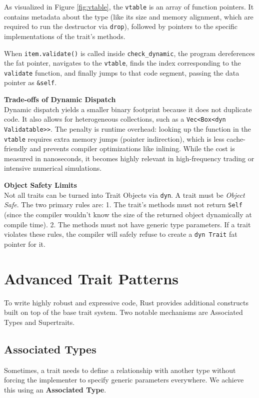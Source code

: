 As visualized in Figure \ref{fig:vtable}, the \texttt{vtable} is an array of function pointers. It contains metadata about the type (like its size and memory alignment, which are required to run the destructor via \texttt{drop}), followed by pointers to the specific implementations of the trait's methods. 

When \texttt{item.validate()} is called inside \texttt{check\_dynamic}, the program dereferences the fat pointer, navigates to the \texttt{vtable}, finds the index corresponding to the \texttt{validate} function, and finally jumps to that code segment, passing the data pointer as \texttt{\&self}.

\begin{exambox}
\textbf{Trade-offs of Dynamic Dispatch} \\
Dynamic dispatch yields a smaller binary footprint because it does not duplicate code. It also allows for heterogeneous collections, such as a \texttt{Vec<Box<dyn Validatable>>}. The penalty is runtime overhead: looking up the function in the \texttt{vtable} requires extra memory jumps (pointer indirection), which is less cache-friendly and prevents compiler optimizations like inlining. While the cost is measured in nanoseconds, it becomes highly relevant in high-frequency trading or intensive numerical simulations.
\end{exambox}

\begin{warningbox}
\textbf{Object Safety Limits} \\
Not all traits can be turned into Trait Objects via \texttt{dyn}. A trait must be \textit{Object Safe}. The two primary rules are:
1. The trait's methods must not return \texttt{Self} (since the compiler wouldn't know the size of the returned object dynamically at compile time).
2. The methods must not have generic type parameters.
If a trait violates these rules, the compiler will safely refuse to create a \texttt{dyn Trait} fat pointer for it.
\end{warningbox}

\section*{Advanced Trait Patterns}

To write highly robust and expressive code, Rust provides additional constructs built on top of the base trait system. Two notable mechanisms are Associated Types and Supertraits.

\subsection*{Associated Types}
Sometimes, a trait needs to define a relationship with another type without forcing the implementer to specify generic parameters everywhere. We achieve this using an \textbf{Associated Type}.

